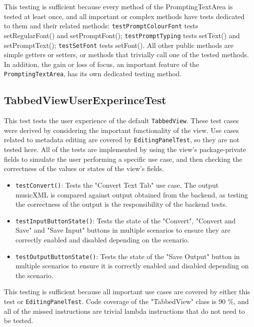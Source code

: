 \documentclass[11pt]{article}
\begin{document}
This testing is sufficient because every method of the PromptingTextArea is tested at least once, and all important or complex methods have tests dedicated to them and their related methods: \texttt{testPromptColourFont} tests setRegularFont() and setPromptFont(); \texttt{testPromptTyping} tests setText() and setPromptText(); \texttt{testSetFont} tests setFont().  All other public methods are simple getters or setters, or methods that trivially call one of the tested methods.  In addition, the gain or loss of focus, an important feature of the \texttt{PromptingTextArea}, has its own dedicated testing method.
\subsection{TabbedViewUserExperinceTest}
\label{sec:org2cda29a}
This test tests the user experience of the default \texttt{TabbedView}.  These test cases were derived by considering the important functionality of the view.  Use cases related to metadata editing are covered by \texttt{EditingPanelTest}, so they are not tested here.
All of the tests are implemented by using the view's package-private fields to simulate the user performing a specific use case, and then checking the correctness of the values or states of the view's fields.
\begin{itemize}
\item \texttt{testConvert()}: Tests the "Convert Text Tab" use case.  The output musicXML is compared against output obtained from the backend, as testing the correctness of the output is the responsibility of the backend tests.
\item \texttt{testInputButtonState()}: Tests the state of the "Convert", "Convert and Save" and "Save Input" buttons in multiple scenarios to ensure they are correctly enabled and disabled depending on the scenario.
\item \texttt{testOutputButtonState()}: Tests the state of the "Save Output" button in multiple scenarios to ensure it is correctly enabled and disabled depending on the scenario.
\end{itemize}

This testing is sufficient because all important use cases are covered by either this test or \texttt{EditingPanelTest}.  Code coverage of the "TabbedView" class is 90 \%, and all of the missed instructions are trivial lambda instructions that do not need to be tested.
\end{document}
